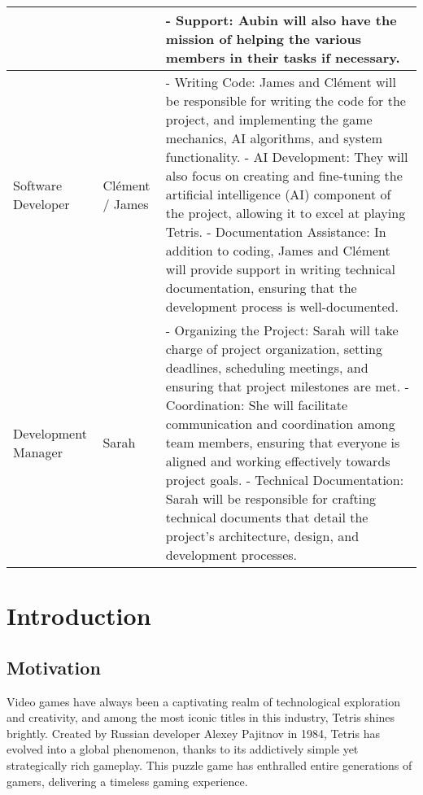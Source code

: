 \documentclass[conference]{IEEEtran}
\begin{document}
\begin{center}
\begin{tabular}{ | m{1.8cm} | m{1.2cm}| m{5.2cm} | }    
    &
    &
    - Support: Aubin will also have the mission of helping the various members in their tasks if necessary.\\
    \hline
    Software Developer & 
    Clément / James & 
    - Writing Code: James and Clément will be responsible for writing the code for the project, and implementing the game mechanics, AI algorithms, and system functionality.
    \newline- AI Development: They will also focus on creating and fine-tuning the artificial intelligence (AI) component of the project, allowing it to excel at playing Tetris.
    \newline- Documentation Assistance: In addition to coding, James and Clément will provide support in writing technical documentation, ensuring that the development process is well-documented. \\
    \hline
    Development Manager & 
    Sarah & 
    - Organizing the Project: Sarah will take charge of project organization, setting deadlines, scheduling meetings, and ensuring that project milestones are met.
    \newline- Coordination: She will facilitate communication and coordination among team members, ensuring that everyone is aligned and working effectively towards project goals.
    \newline- Technical Documentation: Sarah will be responsible for crafting technical documents that detail the project's architecture, design, and development processes.\\
    \hline
\end{tabular}
\end{center}



\section{Introduction}
\subsection*{Motivation}
Video games have always been a captivating realm of technological exploration and creativity, and among the most iconic titles in this industry, Tetris shines brightly. Created by Russian developer Alexey Pajitnov in 1984, Tetris has evolved into a global phenomenon, thanks to its addictively simple yet strategically rich gameplay. This puzzle game has enthralled entire generations of gamers, delivering a timeless gaming experience.
\end{document}
